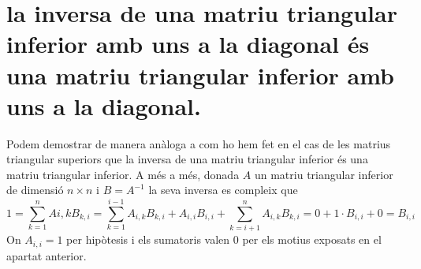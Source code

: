 \documentclass[a4paper,10pt]{article}
\renewcommand{\*}{\cdot}
\begin{document}
\section{la inversa de una matriu triangular inferior amb uns a la diagonal és una matriu triangular inferior amb uns a la diagonal.}
Podem demostrar de manera anàloga a com ho hem fet en el cas de les matrius triangular superiors que la inversa de una matriu triangular inferior és una matriu triangular
inferior. A més a més, donada $A$ un matriu triangular inferior de dimensió $n\times n$ i $B=A^{-1}$ la seva inversa es compleix que
$$1=\sum_{k=1}^nA{i,k}B_{k,i}=\sum_{k=1}^{i-1}A_{i,k}B_{k,i}+A_{i,i}B_{i,i}+\sum_{k=i+1}^{n}A_{i,k}B_{k,i}=0+1\*B_{i,i}+0=B_{i,i}$$
On $A_{i,i}=1$ per hipòtesis i els sumatoris valen 0 per els motius exposats en el apartat anterior.
\end{document}
